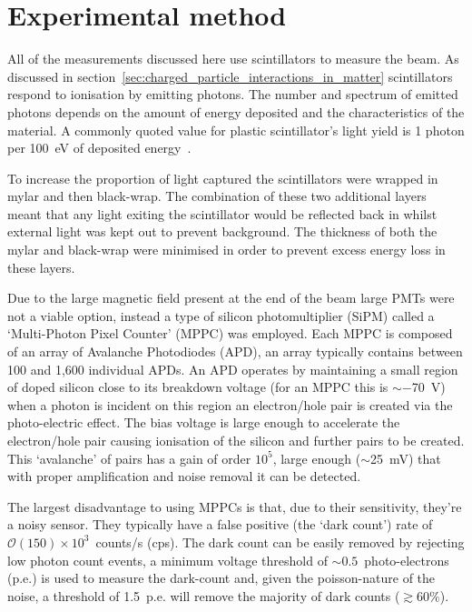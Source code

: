 \section{Experimental method} %
\label{sec:experimental_method}
All of the measurements discussed here use scintillators to measure the beam. As discussed in section~\ref{sec:charged_particle_interactions_in_matter} scintillators respond to ionisation by emitting photons. The number and spectrum of emitted photons depends on the amount of energy deposited and the characteristics of the material. A commonly quoted value for plastic scintillator's light yield is 1 photon per 100~eV of deposited energy~\cite{PDG particle detectors review}. 

To increase the proportion of light captured the scintillators were wrapped in mylar and then black-wrap. The combination of these two additional layers meant that any light exiting the scintillator would be reflected back in whilst external light was kept out to prevent background. The thickness of both the mylar and black-wrap were minimised in order to prevent excess energy loss in these layers.

Due to the large magnetic field present at the end of the beam large PMTs were not a viable option, instead a type of silicon photomultiplier (SiPM) called a `Multi-Photon Pixel Counter' (MPPC) was employed. Each MPPC is composed of an array of Avalanche Photodiodes (APD), an array typically contains between 100 and 1,600 individual APDs. An APD operates by maintaining a small region of doped silicon close to its breakdown voltage (for an MPPC this is \( \sim -\)70~V) when a photon is incident on this region an electron/hole pair is created via the photo-electric effect. The bias voltage is large enough to accelerate the electron/hole pair causing ionisation of the silicon and further pairs to be created. This `avalanche' of pairs has a gain of order \( 10^5 \), large enough (\( \sim \)25~mV) that with proper amplification and noise removal it can be detected.

The largest disadvantage to using MPPCs is that, due to their sensitivity, they're a noisy sensor. They typically have a false positive (the `dark count') rate of \( \mathcal{O}(150)\times10^3 \)~counts/s (cps). The dark count can be easily removed by rejecting low photon count events, a minimum voltage threshold of \( \sim 0.5\)~photo-electrons (p.e.) is used to measure the dark-count and, given the poisson-nature of the noise, a threshold of 1.5~p.e. will remove the majority of dark counts (\(\gtrsim60\%\)). 

